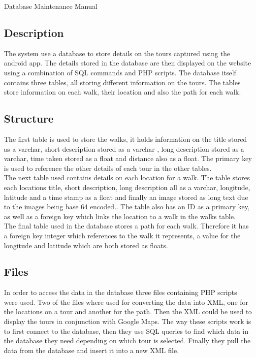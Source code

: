 \documentclass{article}
\begin{document}
	\begin{section}{Database Maintenance Manual}
		\subsection{Description}
		The system use a database to store details on the tours captured using the android app. The details stored in the database are then displayed on the website using a combination of SQL commands and PHP scripts. The database itself contains three tables, all storing different information on the tours. The tables store information on each walk, their location and also the path for each walk.


		\subsection{Structure}
		The first table is used to store the walks, it holds information on the title stored as a varchar, short description stored as a varchar , long description stored as a varchar, time taken stored as a float and distance also as a float. The primary key is used to reference the other details of each tour in the other tables. \\
		
		The next table used contains details on each location for a walk. The table stores each locations title, short description, long description all as a varchar, longitude, latitude and a time stamp as a float and finally an image stored as long text due to the images being base 64 encoded.. The table also has an ID as a primary key, as well as a foreign key which links the location to a walk in the walks table. \\
		
		The final table used in the database stores a path for each walk. Therefore it has a foreign key integer which references to the walk it represents, a value for the longitude and latitude which are both stored as floats. 

		\subsection{Files}
		In order to access the data in the database three files containing PHP scripts were used. Two of the files where used for converting the data into XML, one for the locations on a tour and another for the path. Then the XML could be used to display the tours in conjunction with Google Maps. The way these scripts work is to first connect to the database, then they use SQL queries to find which data in the database they need depending on which tour is selected. Finally they pull the data from the database and insert it into a new XML file. \\
		

\end{section}
\end{document}
